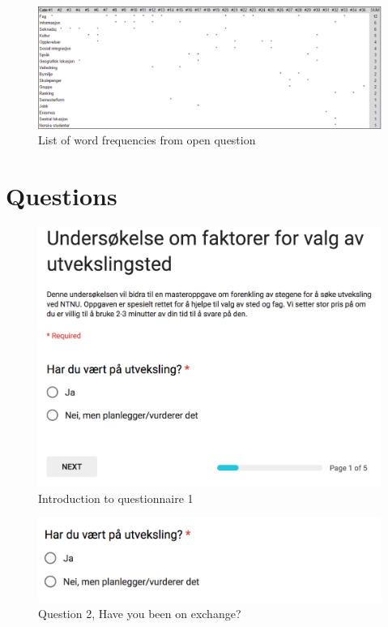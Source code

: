 \FloatBarrier
\label{appendix:word_frequency}

\begin{figure}[h]
    \centering
    \includegraphics[width=1.0\textwidth]{fig/word_freq.png}
    \caption[]{List of word frequencies from open question}
    \label{fig:word_frequency}
\end{figure}

\FloatBarrier
\section{Questions} 

\begin{figure}[h]
    \centering
\includegraphics[width=1\textwidth]{fig/form1/intro.png}
    \caption[]{Introduction to questionnaire 1}
    \label{fig:q11}
\end{figure}

\begin{figure}[h]
    \centering
    
\includegraphics[width=1\textwidth]{fig/form1/exchange.png}
    \caption[]{Question 2, Have you been on exchange?}
    \label{fig:q12}
\end{figure}

